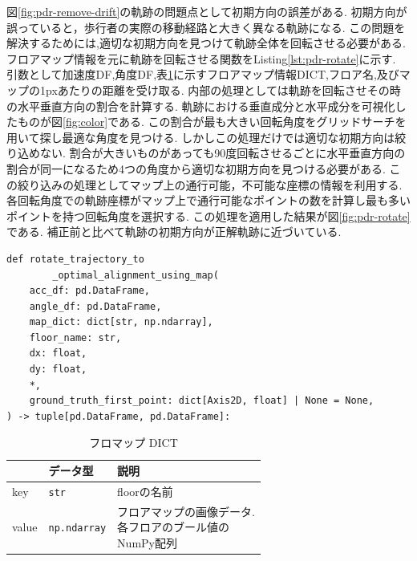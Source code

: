
図\ref{fig:pdr-remove-drift}の軌跡の問題点として初期方向の誤差がある.
初期方向が誤っていると，歩行者の実際の移動経路と大きく異なる軌跡になる.
この問題を解決するためには,適切な初期方向を見つけて軌跡全体を回転させる必要がある.
フロアマップ情報を元に軌跡を回転させる関数をListing\ref{lst:pdr-rotate}に示す.
引数として加速度DF,角度DF,表\ref{tab:map_dict}に示すフロアマップ情報DICT,フロア名,及びマップの1pxあたりの距離を受け取る.
内部の処理としては軌跡を回転させその時の水平垂直方向の割合を計算する.
軌跡における垂直成分と水平成分を可視化したものが図\ref{fig:color}である.
この割合が最も大きい回転角度をグリッドサーチを用いて探し最適な角度を見つける.
しかしこの処理だけでは適切な初期方向は絞り込めない.
割合が大きいものがあっても90度回転させるごとに水平垂直方向の割合が同一になるため4つの角度から適切な初期方向を見つける必要がある.
この絞り込みの処理としてマップ上の通行可能，不可能な座標の情報を利用する.
各回転角度での軌跡座標がマップ上で通行可能なポイントの数を計算し最も多いポイントを持つ回転角度を選択する.
この処理を適用した結果が図\ref{fig:pdr-rotate}である.
補正前と比べて軌跡の初期方向が正解軌跡に近づいている.

\begin{lstlisting}[caption={初期方向補正}, label=lst:pdr-rotate]
def rotate_trajectory_to
		_optimal_alignment_using_map(
    acc_df: pd.DataFrame,
    angle_df: pd.DataFrame,
    map_dict: dict[str, np.ndarray],
    floor_name: str,
    dx: float,
    dy: float,
    *,
    ground_truth_first_point: dict[Axis2D, float] | None = None,
) -> tuple[pd.DataFrame, pd.DataFrame]:
\end{lstlisting}

\begin{table}[ht]
	\centering
	\begin{tabular}{lll}
		\hline
		      & \textbf{データ型}       & \textbf{説明}             \\ \hline
		key   & \texttt{str}        & floorの名前                \\ \hline
		value & \texttt{np.ndarray} & \makecell{フロアマップの画像データ. \\各フロアのブール値の\\NumPy配列} \\ \hline
	\end{tabular}
	\caption{フロマップ DICT}
	\label{tab:map_dict}
\end{table}

